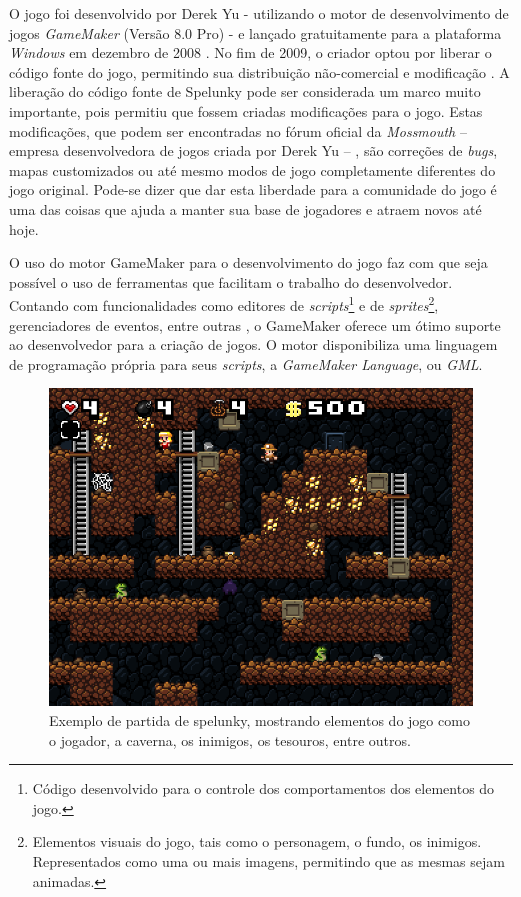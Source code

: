 O jogo foi desenvolvido por Derek Yu - utilizando o motor de desenvolvimento de
jogos \textit{GameMaker} (Versão 8.0 Pro) - e lançado gratuitamente para a
plataforma \textit{Windows} em dezembro de 2008 \cite{SPELUNKYRELEASE}. No fim
de 2009, o criador optou por liberar o código fonte do jogo, permitindo sua
distribuição não-comercial e modificação \cite{SPELUNKYLICENSE}. A liberação do
código fonte de Spelunky pode ser considerada um marco muito importante, pois
permitiu que fossem criadas modificações para o jogo. Estas modificações, que
podem ser encontradas no fórum oficial da \textit{Mossmouth} -- empresa
desenvolvedora de jogos criada por Derek Yu -- \cite{SPELUNKYFORUM}, são
correções de \textit{bugs}, mapas customizados ou até mesmo modos de jogo
completamente diferentes do jogo original. Pode-se dizer que dar esta liberdade
para a comunidade do jogo é uma das coisas que ajuda a manter sua base de
jogadores e atraem novos até hoje.

O uso do motor GameMaker para o desenvolvimento do jogo faz com que seja
possível o uso de ferramentas que facilitam o trabalho do desenvolvedor.
Contando com funcionalidades como editores de \textit{scripts}\footnote{Código
desenvolvido para o controle dos comportamentos dos elementos do jogo.} e de
\textit{sprites}\footnote{Elementos visuais do jogo, tais como o personagem, o
fundo, os inimigos. Representados como uma ou mais imagens, permitindo que as
mesmas sejam animadas.}, gerenciadores de eventos, entre outras
\cite{GMAKER8DOCS}, o GameMaker oferece um ótimo suporte ao desenvolvedor para
a criação de jogos. O motor disponibiliza uma linguagem de programação própria
para seus \textit{scripts}, a \textit{GameMaker Language}, ou \textit{GML}.

\begin{figure}[htb!]
\centering\includegraphics[width=.65\textwidth]{fig/spelunky-pc-screen.png}
\caption {\label{fig:spelunky-gameplay}Exemplo de partida de spelunky, mostrando
elementos do jogo como o jogador, a caverna, os inimigos, os tesouros, entre
outros.} \end{figure}


